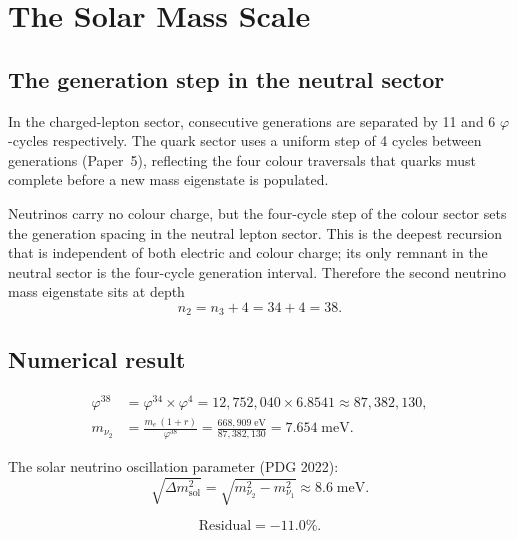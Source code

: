 \documentclass[12pt]{article}
\begin{document}
\section{The Solar Mass Scale}

\subsection{The generation step in the neutral sector}

In the charged-lepton sector, consecutive generations are separated
by 11 and 6 $\varphi$-cycles respectively.  The quark sector uses
a uniform step of 4 cycles between generations (Paper~5), reflecting
the four colour traversals that quarks must complete before a new
mass eigenstate is populated.

Neutrinos carry no colour charge, but the four-cycle step of the
colour sector sets the generation spacing in the neutral lepton sector.
This is the deepest recursion that is independent of both electric and
colour charge; its only remnant in the neutral sector is the
four-cycle generation interval.  Therefore the second neutrino mass
eigenstate sits at depth
\begin{equation}
  n_2 = n_3 + 4 = 34 + 4 = 38.
  \label{eq:n2}
\end{equation}

\subsection{Numerical result}

\begin{align}
  \varphi^{38} &= \varphi^{34} \times \varphi^{4}
               = 12{,}752{,}040 \times 6.8541
               \approx 87{,}382{,}130,\\[4pt]
  m_{\nu_2}   &= \frac{m_e\,(1+r)}{\varphi^{38}}
               = \frac{668{,}909\;\text{eV}}{87{,}382{,}130}
               = 7.654\;\text{meV}.
\end{align}

The solar neutrino oscillation parameter (PDG 2022):
\begin{equation}
  \sqrt{\Delta m^2_{\text{sol}}}
    = \sqrt{m_{\nu_2}^2 - m_{\nu_1}^2}
    \approx 8.6\;\text{meV}.
\end{equation}

\[
  \text{Residual} = -11.0\%.
\]
\end{document}
